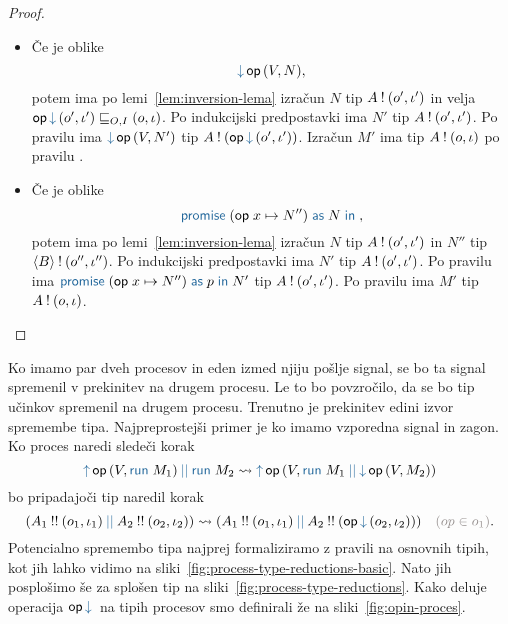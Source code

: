 \begin{proof}
\begin{itemize}
\begin{itemize}
			\item Če je oblike $$\tmopin{op}{V}{N},$$ potem ima po lemi~\ref{lem:inversion-lema} izračun $N$ tip $A \mathbin{!} (o', \iota')$ in velja $\opincomp{op}{(\o', \i')} \order{O, I} (\o, \i)$.
			Po indukcijski predpostavki ima $N'$ tip $A \mathbin{!} (o', \iota')$.
			Po pravilu  ima $\tmopin{op}{V}{N'}$ tip $\tycomp{A}{\opincomp{op}{(\o', \i')}}$.
			Izračun $M'$ ima tip $A \mathbin{!} (o, \iota)$ po pravilu .
			
			\item Če je oblike $$\tmwith{op}{x}{N''}{N},$$ potem ima po lemi~\ref{lem:inversion-lema} izračun $N$ tip $A \mathbin{!} (o', \iota')$ in $N''$ tip $\langle B \rangle \mathbin{!} (o'', \iota'')$.
			Po indukcijski predpostavki ima $N'$ tip $A \mathbin{!} (o', \iota')$.
			Po pravilu  ima $\tmwith{op}{x}{N''}{p}{N'}$ tip $A \mathbin{!} (o', \iota')$.
			Po pravilu  ima $M'$ tip $A \mathbin{!} (o, \iota)$.
		\end{itemize}

	\end{itemize}

\end{proof}


Ko imamo par dveh procesov in eden izmed njiju pošlje signal, se bo ta signal spremenil v prekinitev na drugem procesu.
Le to bo povzročilo, da se bo tip učinkov spremenil na drugem procesu. Trenutno je prekinitev edini izvor spremembe tipa.
Najpreprostejši primer je ko imamo vzporedna signal in zagon.
Ko proces naredi sledeči korak $$\tmpar{\tmopout{op}{V}{\tmrun{M_1}}}{\tmrun{M_2}} \reduces \tmopout{op}{V}{\tmpar{\tmrun{M_1}}{\tmopin{op}{V}{M_2}}}$$ bo pripadajoči tip naredil korak
$$\typar{\tyrun{A_1}{\o_1, \i_1}}{\tyrun{A_2}{\o_2, \i_2}} \tyreduces \typar{\tyrun{A_1}{\o_1, \i_1}}{\tyrun{A_2}{\opincomp{op}{(\o_2, \i_2)}}} \quad {\color{rulenameColor}(op \in o_1)}.$$
Potencialno spremembo tipa najprej formaliziramo z pravili na osnovnih tipih, kot jih lahko vidimo na sliki~\ref{fig:process-type-reductions-basic}. Nato jih posplošimo še za splošen tip na sliki~\ref{fig:process-type-reductions}.
Kako deluje operacija $\opincomp{op}{}$ na tipih procesov smo definirali že na sliki~\ref{fig:opin-proces}.

